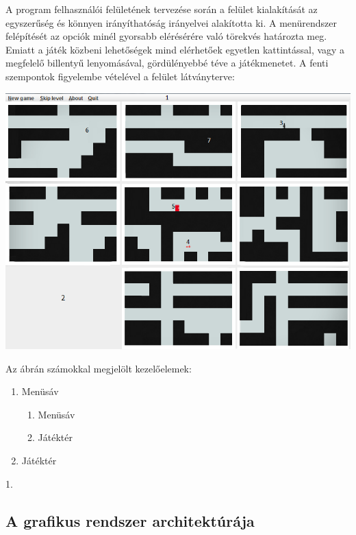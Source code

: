 	A program felhasználói felületének tervezése során a felület kialakítását az egyszerűség és könnyen irányíthatóság irányelvei alakította ki. A menürendszer  felépítését az opciók minél gyorsabb elérésérére való törekvés határozta meg. Emiatt a játék közbeni lehetőségek mind elérhetőek egyetlen kattintással, vagy a megfelelő billentyű lenyomásával, gördülényebbé téve a játékmenetet. A fenti szempontok figyelembe vételével a felület látványterve:
	\begin{center}
		    \includegraphics[scale=0.7]{resources/gui_own.png}
	 \end{center}
	 Az ábrán számokkal megjelölt kezelőelemek:
	 \begin{enumerate}
 \item Menüsáv
 		\begin{enumerate}
 		\item Menüsáv
 		\item Játéktér
		\end{enumerate}
 \item Játéktér
\end{enumerate}
1. 


		\subsection{A grafikus rendszer architektúrája}
		

